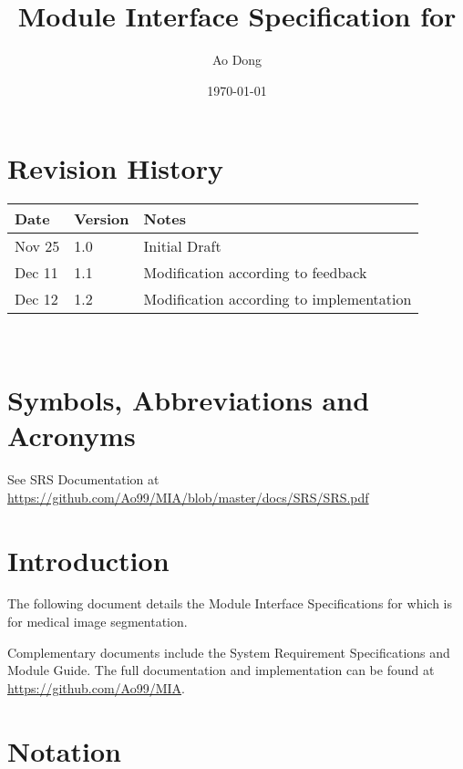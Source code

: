 \documentclass[12pt, titlepage]{article}
\begin{document}
\title{Module Interface Specification for \progname}

\author{Ao Dong}

\date{\today}

\maketitle


\section{Revision History}

\begin{tabularx}{\textwidth}{p{3cm}p{2cm}X}
\toprule {\bf Date} & {\bf Version} & {\bf Notes}\\
\midrule
Nov 25 & 1.0 & Initial Draft\\
Dec 11 & 1.1 & Modification according to feedback\\
Dec 12 & 1.2 & Modification according to implementation\\
\bottomrule
\end{tabularx}

~\newpage

\section{Symbols, Abbreviations and Acronyms}

See SRS Documentation at
\url{https://github.com/Ao99/MIA/blob/master/docs/SRS/SRS.pdf}

\newpage

\tableofcontents

\newpage


\section{Introduction}

The following document details the Module Interface Specifications for
\progname{} which is for medical image segmentation.

Complementary documents include the System Requirement Specifications
and Module Guide.  The full documentation and implementation can be
found at \url{https://github.com/Ao99/MIA}.

\section{Notation}
\end{document}
